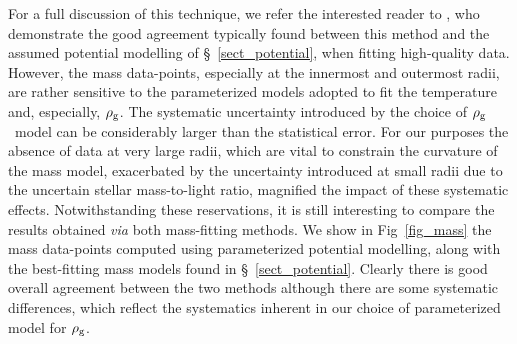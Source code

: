 \documentclass{emulateapj}
\newcommand{\rhog}{${\rm \rho_g}$}
\begin{document}
For a full discussion of this technique, we refer the interested
reader to \citet{buote06a}, who demonstrate the good agreement 
typically found between this method and the assumed potential
modelling of \S~\ref{sect_potential}, when fitting high-quality data.
However, the mass data-points, especially at the innermost and outermost
radii, are rather sensitive to the parameterized models adopted to fit
the temperature and, especially, \rhog. The systematic uncertainty
introduced by the choice of \rhog\ model can be considerably  
larger than the statistical error. For our purposes the absence of data 
at very large radii, which are vital to constrain the curvature of the mass 
model, exacerbated by the uncertainty introduced at small radii due to
the uncertain stellar mass-to-light ratio, magnified the impact of these 
systematic effects. Notwithstanding these reservations, it is still interesting
to compare the results obtained {\em via} both mass-fitting methods. 
We show in Fig~\ref{fig_mass} the mass data-points computed using parameterized
potential modelling, along with the best-fitting mass models
found in \S~\ref{sect_potential}. Clearly there is good overall agreement 
between the two methods although there are some systematic differences,
which reflect the systematics inherent in our choice of 
parameterized model for \rhog.
\end{document}
